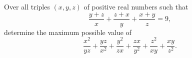 Over all triples $\left(x,y,z\right)$ of positive real numbers such that \[\frac{y+z}{x}+\frac{z+x}{y}+\frac{x+y}{z}=9,\] determine the maximum possible value of \[\frac{x^2}{yz}+\frac{yz}{x^2}+\frac{y^2}{zx}+\frac{zx}{y^2}+\frac{z^2}{xy}+\frac{xy}{z^2}.\]